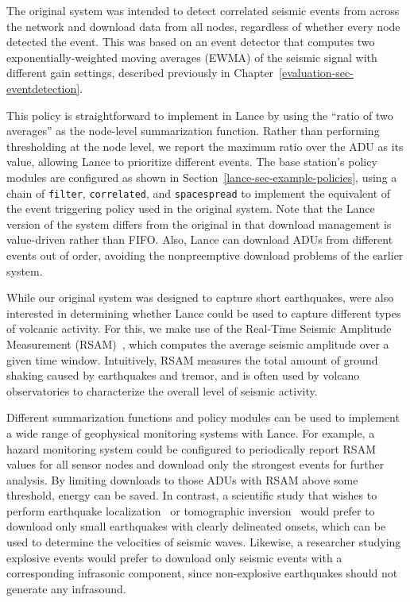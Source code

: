 The original system was intended to detect correlated seismic events from
across the network and download data from all nodes, regardless of whether
every node detected the event. This was based on an event detector that
computes two exponentially-weighted moving averages (EWMA) of the seismic
signal with different gain settings, described previously in
Chapter~\ref{evaluation-sec-eventdetection}.

This policy is straightforward to implement in Lance by using the ``ratio of
two averages'' as the node-level summarization function. Rather than
performing thresholding at the node level, we report the maximum ratio over
the ADU as its value, allowing Lance to prioritize different events. The base
station's policy modules are configured as shown in
Section~\ref{lance-sec-example-policies}, using a chain of \texttt{filter},
\texttt{correlated}, and \texttt{spacespread} to implement the equivalent of
the event triggering policy used in the original system. Note that the Lance
version of the system differs from the original in that download management
is value-driven rather than FIFO. Also, Lance can download ADUs from
different events out of order, avoiding the nonpreemptive download problems
of the earlier system.

While our original system was designed to capture short earthquakes, were
also interested in determining whether Lance could be used to capture
different types of volcanic activity. For this, we make use of the Real-Time
Seismic Amplitude Measurement (RSAM)~\cite{rsam}, which computes the average
seismic amplitude over a given time window. Intuitively, RSAM measures the
total amount of ground shaking caused by earthquakes and tremor, and is often
used by volcano observatories to characterize the overall level of seismic
activity.

Different summarization functions and policy modules can be used to implement
a wide range of geophysical monitoring systems with Lance. For example, a
hazard monitoring system could be configured to periodically report RSAM
values for all sensor nodes and download only the strongest events for
further analysis. By limiting downloads to those ADUs with RSAM above some
threshold, energy can be saved. In contrast, a scientific study that wishes
to perform earthquake localization~\cite{aki-richards-80} or tomographic
inversion~\cite{lees-lindley-94} would prefer to download only small
earthquakes with clearly delineated onsets, which can be used to determine
the velocities of seismic waves. Likewise, a researcher studying explosive
events would prefer to download only seismic events with a corresponding
infrasonic component, since non-explosive earthquakes should not generate any
infrasound.

